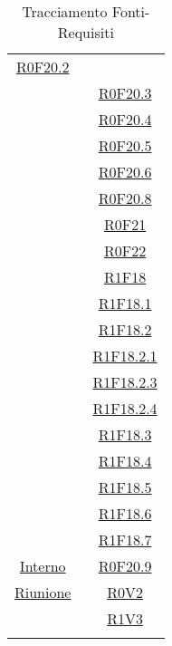 \documentclass[../AnalisiDeiRequisiti.tex]{subfiles}
\begin{document}
\begin{longtable}{|c|c|}
	\hyperlink{R0F20.2}{R0F20.2}\\& \
	\hyperlink{R0F20.3}{R0F20.3}\\& \
	\hyperlink{R0F20.4}{R0F20.4}\\& \
	\hyperlink{R0F20.5}{R0F20.5}\\& \
	\hyperlink{R0F20.6}{R0F20.6}\\& \
	\hyperlink{R0F20.8}{R0F20.8}\\& \
	\hyperlink{R0F21}{R0F21}\\& \
	\hyperlink{R0F22}{R0F22}\\& \
	\hyperlink{R1F18}{R1F18}\\& \
	\hyperlink{R1F18.1}{R1F18.1}\\& \
	\hyperlink{R1F18.2}{R1F18.2}\\& \
	\hyperlink{R1F18.2.1}{R1F18.2.1}\\& \
	\hyperlink{R1F18.2.3}{R1F18.2.3}\\& \
	\hyperlink{R1F18.2.4}{R1F18.2.4}\\& \
	\hyperlink{R1F18.3}{R1F18.3}\\& \
	\hyperlink{R1F18.4}{R1F18.4}\\& \
	\hyperlink{R1F18.5}{R1F18.5}\\& \
	\hyperlink{R1F18.6}{R1F18.6}\\& \
	\hyperlink{R1F18.7}{R1F18.7}\\\hline
	\hyperlink{Interno}{Interno} & \
	\hyperlink{R0F20.9}{R0F20.9}\\\hline
	\hyperlink{Riunione}{Riunione} & \
	\hyperlink{R0V2}{R0V2}\\& \
	\hyperlink{R1V3}{R1V3}\\\hline
	\caption[Tracciamento Fonti-Requisiti]{Tracciamento Fonti-Requisiti}
	\label{tabella:fonti-requi}
\end{longtable}
\clearpage
\end{document}
